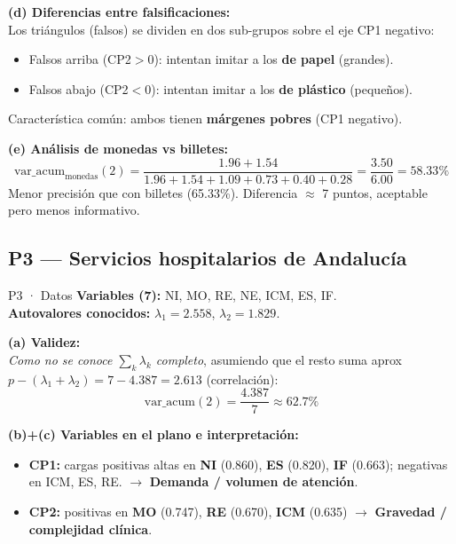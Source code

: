 \documentclass[11pt,a4paper]{article}
\begin{document}
\textbf{(d) Diferencias entre falsificaciones:}\\
Los triángulos (falsos) se dividen en dos sub-grupos sobre el eje CP1 negativo:
\begin{itemize}[leftmargin=*]
    \item Falsos arriba (CP2$>$0): intentan imitar a los \textbf{de papel} (grandes).
    \item Falsos abajo (CP2$<$0): intentan imitar a los \textbf{de plástico} (pequeños).
\end{itemize}
Característica común: ambos tienen \textbf{márgenes pobres} (CP1 negativo).

\textbf{(e) Análisis de monedas vs billetes:}
\[
\mathrm{var\_acum}_\text{monedas}(2) = \frac{1.96+1.54}{1.96+1.54+1.09+0.73+0.40+0.28} = \frac{3.50}{6.00} = \boxed{58.33\%}
\]
Menor precisión que con billetes (65.33\%). Diferencia $\approx$ 7 puntos, aceptable pero menos informativo.

\hrulefill

\subsection{P3 — Servicios hospitalarios de Andalucía}

\begin{ejerciciobox}{P3 · Datos}
\textbf{Variables (7):} NI, MO, RE, NE, ICM, ES, IF.\\
\textbf{Autovalores conocidos:} $\lambda_1=2.558$, $\lambda_2=1.829$.
\end{ejerciciobox}

\textbf{(a) Validez:}\\
\emph{Como no se conoce $\sum_k \lambda_k$ completo}, asumiendo que el resto suma aprox $p - (\lambda_1+\lambda_2) = 7 - 4.387 = 2.613$ (correlación):
\[
\mathrm{var\_acum}(2) = \frac{4.387}{7} \approx \boxed{62.7\%}
\]

\textbf{(b)+(c) Variables en el plano e interpretación:}
\begin{itemize}[leftmargin=*]
    \item \textbf{CP1:} cargas positivas altas en \textbf{NI} (0.860), \textbf{ES} (0.820), \textbf{IF} (0.663); negativas en ICM, ES, RE. $\to$ \textbf{Demanda / volumen de atención}.
    \item \textbf{CP2:} positivas en \textbf{MO} (0.747), \textbf{RE} (0.670), \textbf{ICM} (0.635) $\to$ \textbf{Gravedad / complejidad clínica}.
\end{itemize}
\end{document}
